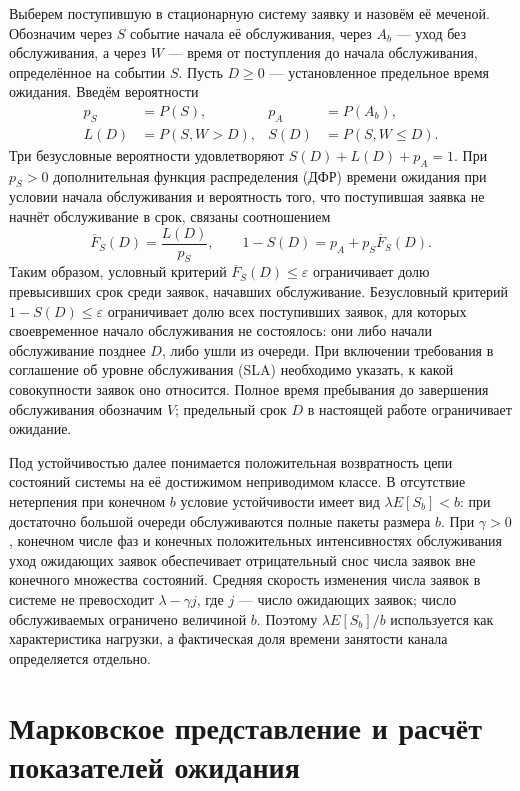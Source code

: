 Выберем поступившую в стационарную систему заявку и назовём её меченой. Обозначим через $S$ событие начала её обслуживания, через $A_b$ --- уход без обслуживания, а через $W$ --- время от поступления до начала обслуживания, определённое на событии $S$. Пусть $D\geq0$ --- установленное предельное время ожидания. Введём вероятности
\begin{align}
 p_S&=P(S), & p_A&=P(A_b),\\
 L(D)&=P(S,W>D), & S(D)&=P(S,W\leq D).
\end{align}
Три безусловные вероятности удовлетворяют $S(D)+L(D)+p_A=1$.
При $p_S>0$ дополнительная функция распределения (ДФР) времени ожидания при условии начала обслуживания и вероятность того, что поступившая заявка не начнёт обслуживание в срок, связаны соотношением
\begin{equation}\label{eq:sla}
 \overline F_S(D)=\frac{L(D)}{p_S},\qquad
 1-S(D)=p_A+p_S\overline F_S(D).
\end{equation}
Таким образом, условный критерий $\overline F_S(D)\leq\varepsilon$ ограничивает долю превысивших срок среди заявок, начавших обслуживание. Безусловный критерий $1-S(D)\leq\varepsilon$ ограничивает долю всех поступивших заявок, для которых своевременное начало обслуживания не состоялось: они либо начали обслуживание позднее $D$, либо ушли из очереди. При включении требования в соглашение об уровне обслуживания (SLA) необходимо указать, к какой совокупности заявок оно относится. Полное время пребывания до завершения обслуживания обозначим $V$; предельный срок $D$ в настоящей работе ограничивает ожидание.

Под устойчивостью далее понимается положительная возвратность цепи состояний системы на её достижимом неприводимом классе. В отсутствие нетерпения при конечном $b$ условие устойчивости имеет вид $\lambda E[S_b]<b$: при достаточно большой очереди обслуживаются полные пакеты размера $b$. При $\gamma>0$, конечном числе фаз и конечных положительных интенсивностях обслуживания уход ожидающих заявок обеспечивает отрицательный снос числа заявок вне конечного множества состояний. Средняя скорость изменения числа заявок в системе не превосходит $\lambda-\gamma j$, где $j$ --- число ожидающих заявок; число обслуживаемых ограничено величиной $b$. Поэтому $\lambda E[S_b]/b$ используется как характеристика нагрузки, а фактическая доля времени занятости канала определяется отдельно.

\section*{Марковское представление и расчёт показателей ожидания}

